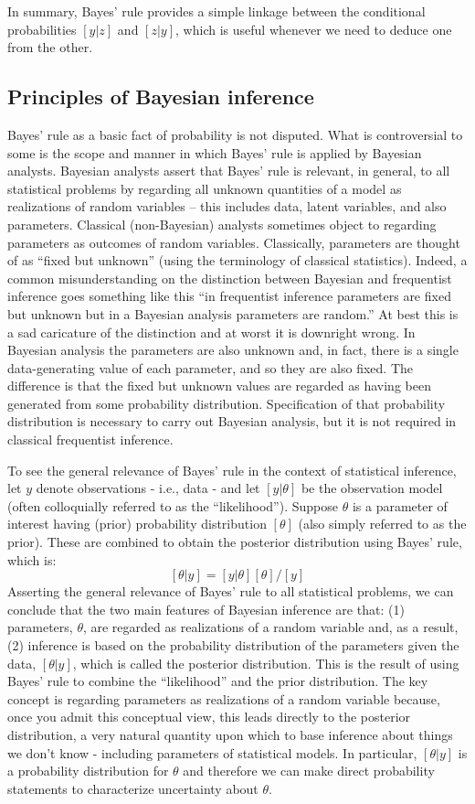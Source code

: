 In summary, Bayes' rule provides a simple linkage between the
conditional probabilities $[y|z]$ and $[z|y]$, which is useful whenever
we need to deduce one from the other.

\subsection{Principles of Bayesian inference}

Bayes' rule as a basic fact of probability is not disputed.
What is controversial to some is the scope and manner in which Bayes'
rule is applied by Bayesian analysts. Bayesian analysts assert that
Bayes' rule is relevant, in general, to all statistical problems by
regarding all unknown quantities of a model as realizations of random
variables -- this includes data, latent variables, and also
parameters. Classical (non-Bayesian) analysts sometimes object to
regarding parameters as outcomes of random variables. Classically,
parameters are thought of as ``fixed but unknown'' (using the
terminology of classical statistics).
Indeed, a common misunderstanding on the distinction between Bayesian and
frequentist inference goes something like this ``in frequentist
inference parameters are fixed but unknown but in a Bayesian analysis
parameters are random.'' At best this is a sad caricature of the
distinction and at worst it is downright wrong. 
In Bayesian analysis the
parameters are also unknown and, in fact, there is a single data-generating
value of each parameter, and so they are also fixed.
The difference is that the fixed
but unknown values are  regarded as having been generated from some
probability distribution. Specification of that probability
distribution is necessary to carry out Bayesian analysis, but it is not
required in classical frequentist inference.


To see the general relevance of Bayes' rule in the context of
statistical inference, let $y$ denote observations - i.e., data -
and let $[y|\theta]$ be the observation model (often colloquially
referred to as the ``likelihood'').  Suppose $\theta$ 
is a parameter of
interest having (prior) probability distribution $[\theta]$ (also simply referred to as the prior). These are
combined to obtain the posterior distribution using Bayes' rule, which
is:
\[
 [\theta|y]= [y|\theta][\theta]/[y]
\]
Asserting the general relevance of Bayes' rule to all statistical
problems, we can conclude that the two main features of Bayesian
inference are that: (1) parameters, $\theta$, are regarded as realizations of
a random variable and, as a result, (2) inference is based on the
probability distribution of the parameters given the data,
$[\theta|y]$,
which is
called the posterior distribution. This is the result of using Bayes'
rule to combine the ``likelihood'' and the prior distribution.  The
key concept is regarding parameters as realizations of a random
variable because, once you admit this conceptual view, this leads
directly to the posterior distribution, a very natural quantity upon
which to base inference about things we don't know -  including
parameters of statistical models.  In particular, $[\theta|y]$ is a
probability distribution for $\theta$ and therefore we can make direct
probability statements to characterize uncertainty about
$\theta$.

